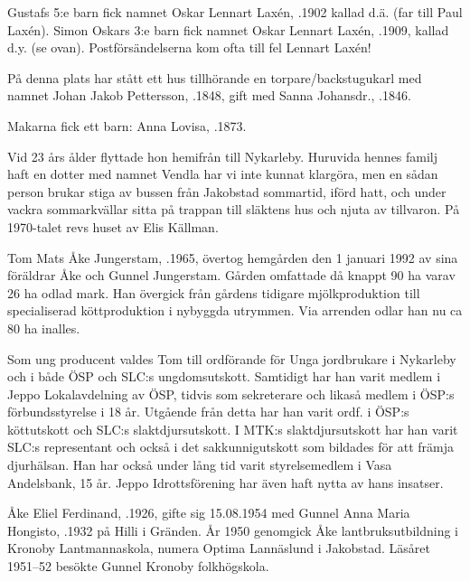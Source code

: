 Gustafs  5:e barn fick namnet Oskar Lennart Laxén, .1902 kallad  d.ä. (far till Paul Laxén). Simon Oskars 3:e barn fick namnet Oskar Lennart Laxén, .1909, kallad d.y. (se ovan). Postförsändelserna kom ofta till fel Lennart Laxén!





På denna plats har stått ett hus tillhörande en torpare/backstugukarl med namnet Johan Jakob Pettersson, .1848, gift med Sanna Johansdr., .1846.

Makarna fick ett barn: Anna Lovisa, .1873.

Vid 23 års ålder flyttade hon hemifrån till Nykarleby. Huruvida hennes familj haft en dotter med namnet Vendla har vi inte kunnat klargöra, men en sådan person brukar stiga av bussen från Jakobstad sommartid, iförd hatt, och under vackra sommarkvällar sitta på trappan till släktens hus och njuta av tillvaron. På 1970-talet revs huset av Elis Källman.






Tom Mats Åke Jungerstam, .1965, övertog hemgården den 1 januari 1992 av sina föräldrar Åke och Gunnel Jungerstam. Gården omfattade då knappt 90 ha varav 26 ha odlad mark. Han övergick från gårdens tidigare mjölkproduktion till specialiserad köttproduktion i nybyggda utrymmen. Via arrenden odlar han nu ca 80 ha inalles.

Som ung producent valdes Tom till ordförande för Unga jordbrukare i Nykarleby och i både ÖSP och SLC:s  ungdomsutskott. Samtidigt har han varit medlem i Jeppo Lokalavdelning av ÖSP, tidvis som sekreterare och likaså medlem i ÖSP:s förbundsstyrelse i 18 år. Utgående från detta har han varit ordf. i ÖSP:s köttutskott och SLC:s slaktdjursutskott. I MTK:s slaktdjursutskott har han varit SLC:s representant och också i det sakkunnigutskott som bildades för att främja djurhälsan. Han har också under lång tid varit styrelsemedlem i Vasa Andelsbank, 15 år. Jeppo Idrottsförening har även haft nytta av hans insatser.


Åke Eliel Ferdinand, .1926, gifte sig 15.08.1954 med Gunnel Anna Maria Hongisto, .1932 på Hilli i Gränden. År 1950 genomgick Åke lantbruksutbildning i Kronoby Lantmannaskola, numera Optima Lannäslund i Jakobstad. Läsåret 1951--52 besökte Gunnel Kronoby folkhögskola.

